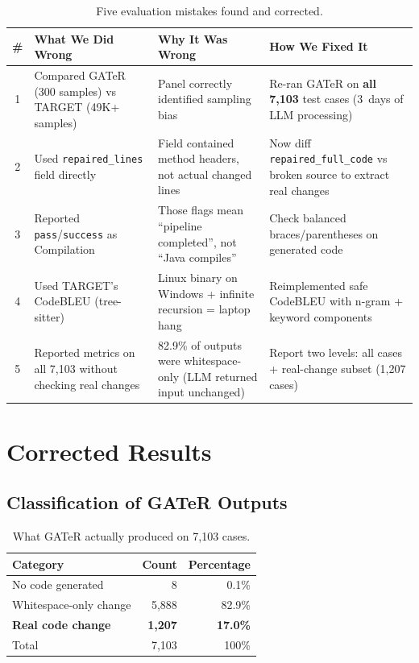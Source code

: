 \documentclass[11pt,a4paper]{article}
\begin{document}
\begin{table}[h!]
\centering\small
\caption{Five evaluation mistakes found and corrected.}
\begin{tabularx}{\textwidth}{|c|X|X|X|}
\hline
\textbf{\#} & \textbf{What We Did Wrong} & \textbf{Why It Was Wrong}
  & \textbf{How We Fixed It} \\
\hline
1 & Compared GATeR (300 samples) vs TARGET (49K+ samples) &
  Panel correctly identified sampling bias &
  Re-ran GATeR on \textbf{all 7,103} test cases (3~days of LLM processing) \\
\hline
2 & Used \texttt{repaired\_lines} field directly &
  Field contained method headers, not actual changed lines &
  Now diff \texttt{repaired\_full\_code} vs broken source to extract real changes \\
\hline
3 & Reported \texttt{pass}/\texttt{success} as Compilation &
  Those flags mean ``pipeline completed'', not ``Java compiles'' &
  Check balanced braces/parentheses on generated code \\
\hline
4 & Used TARGET's CodeBLEU (tree-sitter) &
  Linux binary on Windows + infinite recursion = laptop hang &
  Reimplemented safe CodeBLEU with n-gram + keyword components \\
\hline
5 & Reported metrics on all 7,103 without checking real changes &
  82.9\% of outputs were whitespace-only (LLM returned input unchanged) &
  Report two levels: all cases + real-change subset (1,207 cases) \\
\hline
\end{tabularx}
\end{table}

\section{Corrected Results}

\subsection{Classification of GATeR Outputs}

\begin{table}[h!]
\centering\small
\caption{What GATeR actually produced on 7,103 cases.}
\begin{tabular}{lrr}
\toprule
\textbf{Category} & \textbf{Count} & \textbf{Percentage} \\
\midrule
No code generated       &       8 &  0.1\% \\
Whitespace-only change  &   5,888 & 82.9\% \\
\textbf{Real code change} & \textbf{1,207} & \textbf{17.0\%} \\
\midrule
Total                   &   7,103 & 100\% \\
\bottomrule
\end{tabular}
\end{table}
\end{document}
